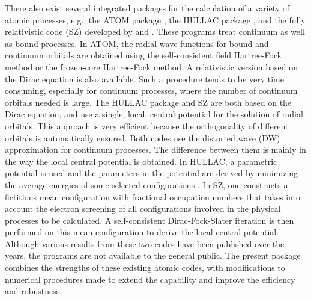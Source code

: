 There also exist several integrated
packages for the calculation of a variety of atomic processes, e.g., the ATOM
package \cite{amusia97}, the HULLAC package \cite{barshalom01}, and the fully
relativistic code (SZ) developed by \citet{sampson89} and
\citet{zhang89}. These programs treat continuum as well as bound
processes. In  
ATOM, the radial wave functions for bound and continuum orbitals are obtained
using the self-consistent field Hartree-Fock method or the frozen-core
Hartree-Fock method. A relativistic version based on the Dirac equation is
also available. Such a procedure tends to be very time consuming, especially
for continuum processes, where the number of continuum orbitals needed is
large. The HULLAC package and SZ are both based on the Dirac equation, and use
a single, local, central potential for the solution of radial orbitals. This
approach is very efficient because the orthogonality of 
different orbitals is automatically ensured. Both codes use the distorted wave
(DW) approximation for continuum processes. The difference between them is
mainly in the way the local central potential is obtained. In HULLAC, 
a parametric potential is used and the parameters in the potential are derived
by minimizing the average energies of some selected configurations
\cite{klapisch77}. In SZ, one 
constructs a fictitious mean configuration with fractional occupation numbers
that takes into account the electron screening of all configurations involved
in the physical processes to be calculated. A self-consistent
Dirac-Fock-Slater iteration is then 
performed on this mean configuration to derive the local central potential. 
Although various results from these two codes have been published over the
years, the programs are not available to the general public. The present
package combines the strengths of these existing atomic codes, with
modifications to numerical procedures made to extend the capability and
improve the efficiency and robustness.

